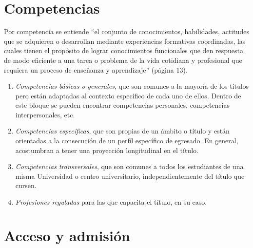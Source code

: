 \section{Competencias}\label{competencias}

Por competencia se entiende ``el conjunto de conocimientos, habilidades,
actitudes que se adquieren o desarrollan mediante experiencias formativas
coordinadas, las cuales tienen el propósito de lograr conocimientos
funcionales que den respuesta de modo eficiente a una tarea o problema de la
vida cotidiana y profesional que requiera un proceso de enseñanza y
aprendizaje''\cite{guiaMadridMasD} (página 13).

\begin{enumerate}
    \item \emph{Competencias básicas o generales}, que son comunes a la mayoría de los
        títulos pero están adaptadas al contexto específico de cada uno de ellos.
        Dentro de este bloque se pueden encontrar competencias personales, competencias
        interpersonales, etc.

    \item \emph{Competencias específicas}, que son propias de un ámbito o título
        y están orientadas a la consecución de un perfil específico de
        egresado. En general, acostumbran a tener una proyección
        longitudinal en el título.

    \item \emph{Competencias transversales}, que son comunes a todos los
        estudiantes de una misma Universidad o centro universitario,
        independientemente del título que cursen.

    \item \emph{Profesiones reguladas} para las que capacita el
        título, en su caso.

\end{enumerate}

\section{Acceso y admisión}

